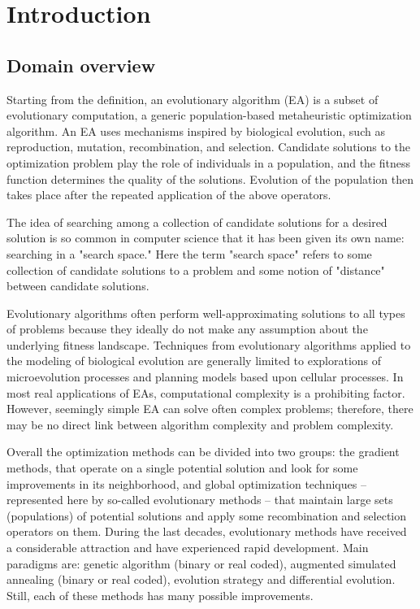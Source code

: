 \chapter{Introduction}

\section{Domain overview}

Starting from the definition, an evolutionary algorithm (EA) is a subset of evolutionary computation, a generic population-based metaheuristic optimization algorithm. An EA uses mechanisms inspired by biological evolution, such as reproduction, mutation, recombination, and selection. Candidate solutions to the optimization problem play the role of individuals in a population, and the fitness function determines the quality of the solutions. Evolution of the population then takes place after the repeated application of the above operators.

The idea of searching among a collection of candidate solutions for a desired solution is so common in computer science that it has been given its own name: searching in a "search space." Here the term "search space" refers to some collection of candidate solutions to a problem and some notion of "distance" between candidate solutions. \cite{introduction_to_ga}

Evolutionary algorithms often perform well-approximating solutions to all types of problems because they ideally do not make any assumption about the underlying fitness landscape. Techniques from evolutionary algorithms applied to the modeling of biological evolution are generally limited to explorations of microevolution processes and planning models based upon cellular processes. In most real applications of EAs, computational complexity is a prohibiting factor. However, seemingly simple EA can solve often complex problems; therefore, there may be no direct link between algorithm complexity and problem complexity.

Overall the optimization methods can be divided into two groups: the gradient methods, that operate on a single potential solution and look for some improvements in its neighborhood, and global optimization techniques – represented here by so-called evolutionary methods – that maintain large sets (populations) of potential solutions and apply some recombination and selection operators on them. During the last decades, evolutionary methods have received a considerable attraction and have experienced rapid development. Main paradigms are: genetic algorithm (binary or real coded), augmented simulated annealing (binary or real coded), evolution strategy and differential evolution. Still, each of these methods has many possible improvements.

